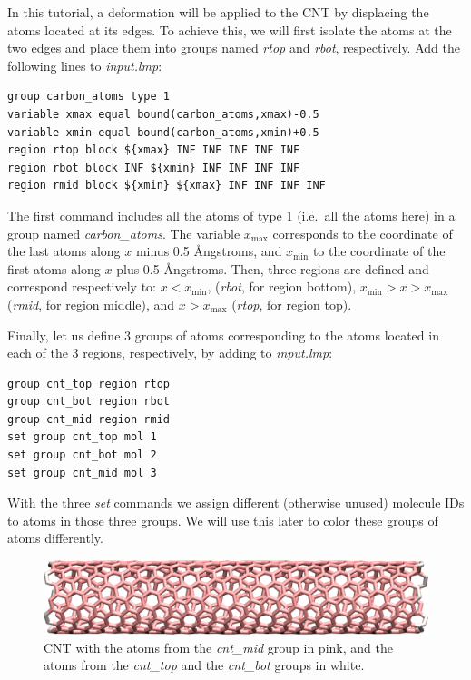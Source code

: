 \documentclass[9pt,tutorial]{livecoms}
\begin{document}
In this tutorial, a deformation will be applied to the CNT by displacing
the atoms located at its edges. To achieve this, we will first isolate the
atoms at the two edges and place them into groups named \textit{rtop} and
\textit{rbot}, respectively. Add the following lines to \textit{input.lmp}:
\begin{lstlisting}
group carbon_atoms type 1
variable xmax equal bound(carbon_atoms,xmax)-0.5
variable xmin equal bound(carbon_atoms,xmin)+0.5
region rtop block ${xmax} INF INF INF INF INF
region rbot block INF ${xmin} INF INF INF INF
region rmid block ${xmin} ${xmax} INF INF INF INF
\end{lstlisting}
The first command includes all the atoms of type 1 (i.e.~all the atoms here)
in a group named \textit{carbon\_atoms}.
The variable $x_\text{max}$ corresponds to the coordinate of the
last atoms along $x$ minus 0.5 Ångstroms, and $x_\text{min}$ to the coordinate
of the first atoms along $x$ plus 0.5 Ångstroms. Then, three regions are defined
and correspond respectively to: $x < x_\text{min}$, (\textit{rbot}, for region
bottom), $x_\text{min} > x > x_\text{max}$ (\textit{rmid}, for region middle),
and $x > x_\text{max}$ (\textit{rtop}, for region top).

Finally, let us define 3 groups of atoms corresponding to the atoms located
in each of the 3 regions, respectively, by adding to \textit{input.lmp}:
\begin{lstlisting}
group cnt_top region rtop
group cnt_bot region rbot
group cnt_mid region rmid
set group cnt_top mol 1
set group cnt_bot mol 2
set group cnt_mid mol 3
\end{lstlisting}
With the three \textit{set} commands we assign different (otherwise unused)
molecule IDs to atoms in those three groups.  We will use this later to
color these groups of atoms differently.

\begin{figure}
\centering
\includegraphics[width=\linewidth]{CNT-underformed}
\caption{CNT with the atoms from the \textit{cnt\_mid} group in pink,
and the atoms from the \textit{cnt\_top} and the \textit{cnt\_bot}
groups in white.}
\label{fig:CNT-underformed}
\end{figure}
\end{document}
